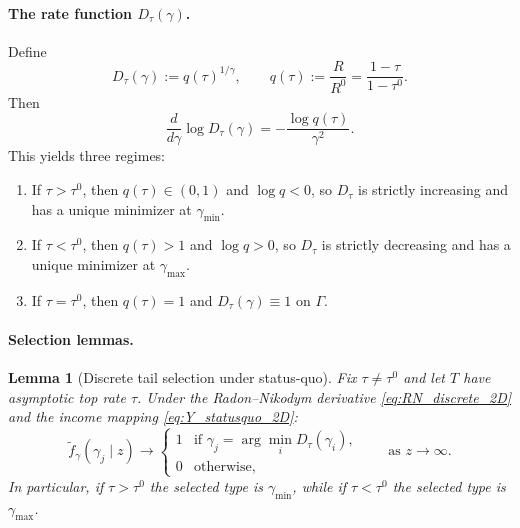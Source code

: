 \documentclass[12pt,a4paper]{article}
\theoremstyle{definition}
\theoremstyle{plain}
\newtheorem{lemma}{Lemma}[section]
\theoremstyle{remark}
\begin{document}
\paragraph{The rate function $D_{\tau}(\gamma)$.}

Define
\begin{equation}
\label{eq:Dtau_def_2D}
  D_{\tau}(\gamma) := q(\tau)^{1/\gamma}, \qquad q(\tau) := \frac{R}{R^0} = \frac{1-\tau}{1-\tau^0}.
\end{equation}
Then
\[
  \frac{d}{d\gamma}\log D_{\tau}(\gamma) = -\frac{\log q(\tau)}{\gamma^2}.
\]
This yields three regimes:
\begin{enumerate}[label=(\roman*)]
  \item If $\tau > \tau^0$, then $q(\tau) \in (0,1)$ and $\log q < 0$, so $D_{\tau}$ is strictly increasing and has a unique minimizer at $\gamma_{\min}$.
  \item If $\tau < \tau^0$, then $q(\tau) > 1$ and $\log q > 0$, so $D_{\tau}$ is strictly decreasing and has a unique minimizer at $\gamma_{\max}$.
  \item If $\tau = \tau^0$, then $q(\tau) = 1$ and $D_{\tau}(\gamma) \equiv 1$ on $\Gamma$.
\end{enumerate}

\paragraph{Selection lemmas.}

\begin{lemma}[Discrete tail selection under status-quo]
\label{lem:discrete_selection_statusquo_2D}
Fix $\tau \neq \tau^0$ and let $T$ have asymptotic top rate $\tau$.  Under the Radon--Nikodym derivative \eqref{eq:RN_discrete_2D} and the income mapping \eqref{eq:Y_statusquo_2D}:
\[
  \widetilde{f}_{\gamma}(\gamma_j \mid z) \to
  \begin{cases} 1 & \text{if } \gamma_j = \arg\min_i D_{\tau}(\gamma_i), \\ 0 & \text{otherwise}, \end{cases}
  \qquad \text{as } z \to \infty.
\]
In particular, if $\tau > \tau^0$ the selected type is $\gamma_{\min}$, while if $\tau < \tau^0$ the selected type is $\gamma_{\max}$.
\end{lemma}
\end{document}
